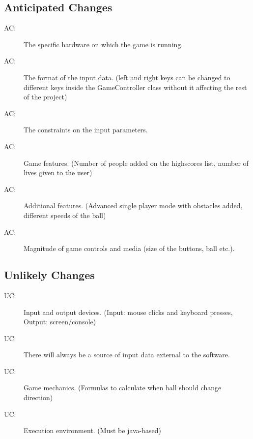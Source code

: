 \documentclass[12pt,letterpaper]{article}
\newcounter{acnum}
\newcommand{\actheacnum}{AC\theacnum}
\newcounter{ucnum}
\newcommand{\uctheucnum}{UC\theucnum}
\begin{document}
	\subsection{Anticipated Changes} \label{SecAchange}
	\begin{description}
	\item[ \actheacnum \label{acHardware}:]	The specific hardware on which the game is running.
	\item[ \actheacnum \label{acInput}:]	The format of the input data. (left and right keys can be changed to different keys inside the GameController class without it affecting the rest of the project)
	\item[ \actheacnum \label{acConstraint}:]	The constraints on the input parameters.
	\item[ \actheacnum \label{acFeatures}:]	Game features. (Number of people added on the highscores list, number of lives given to the user)
	\item[ \actheacnum \label{acMode}:]	Additional features. (Advanced single player mode with obstacles added, different speeds of the ball)
	\item[ \actheacnum \label{acMag}:]	Magnitude of game controls and media (size of the buttons, ball etc.).
	\end{description}	
	\subsection{Unlikely Changes} \label{SecUchange}
	\begin{description}
	\item[ \uctheucnum \label{ucIO}:]	Input and output devices. (Input: mouse clicks and keyboard presses, Output: screen/console)
	\item[ \uctheucnum \label{ucInput}:]	There will always be a source of input data external to the software.
	\item[ \uctheucnum \label{ucMech}:]	Game mechanics. (Formulas to calculate when ball should change direction) 
	\item[ \uctheucnum \label{ucEnv}:]	Execution environment. (Must be java-based)
	\end{description}
\end{document}
